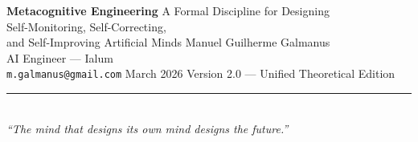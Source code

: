 \documentclass[12pt,a4paper]{article}
\theoremstyle{plain}
\theoremstyle{definition}
\theoremstyle{remark}
\begin{document}
\begin{titlepage}
\begin{center}
\vspace*{2.5cm}
{\Huge \textbf{Metacognitive Engineering}}
\vspace{0.8em}
{\LARGE A Formal Discipline for Designing\\[0.3em]
Self-Monitoring, Self-Correcting,\\[0.3em]
and Self-Improving Artificial Minds}
\vspace{2.5cm}
{\Large Manuel Guilherme Galmanus}\\[0.5em]
{\normalsize AI Engineer --- Ialum}\\[0.3em]
{\small \texttt{m.galmanus@gmail.com}}
\vspace{2cm}
{\large March 2026}
\vspace{0.8em}
{\small Version 2.0 --- Unified Theoretical Edition}
\vspace{2.5cm}
\rule{0.5\textwidth}{0.4pt}\\[1.5em]
\textit{``The mind that designs its own mind designs the future.''}
\end{center}
\end{titlepage}
\end{document}
